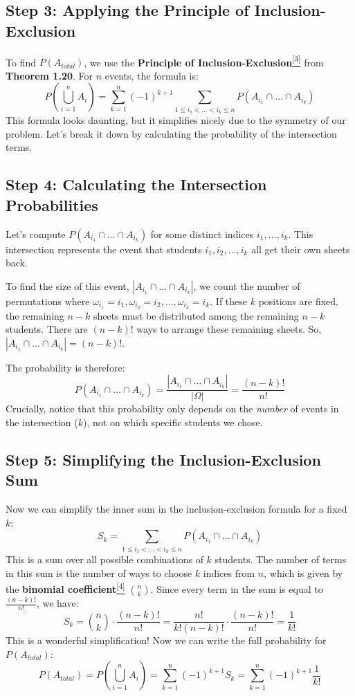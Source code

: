 \documentclass[11pt,a4paper]{article}
\begin{document}
\subsection{Step 3: Applying the Principle of Inclusion-Exclusion}
To find $P(A_{total})$, we use the \textbf{Principle of Inclusion-Exclusion}\hyperlink{note:pie}{\textsuperscript{[3]}} from \textbf{Theorem 1.20}. For $n$ events, the formula is:
\[
    P\left(\bigcup_{i=1}^n A_i\right) = \sum_{k=1}^n (-1)^{k+1} \sum_{1 \le i_1 < \dots < i_k \le n} P(A_{i_1} \cap \dots \cap A_{i_k})
\]
This formula looks daunting, but it simplifies nicely due to the symmetry of our problem. Let's break it down by calculating the probability of the intersection terms.

\subsection{Step 4: Calculating the Intersection Probabilities}
Let's compute $P(A_{i_1} \cap \dots \cap A_{i_k})$ for some distinct indices $i_1, \dots, i_k$.
This intersection represents the event that students $i_1, i_2, \dots, i_k$ all get their own sheets back.

To find the size of this event, $|A_{i_1} \cap \dots \cap A_{i_k}|$, we count the number of permutations where $\omega_{i_1}=i_1, \omega_{i_2}=i_2, \dots, \omega_{i_k}=i_k$.
If these $k$ positions are fixed, the remaining $n-k$ sheets must be distributed among the remaining $n-k$ students. There are $(n-k)!$ ways to arrange these remaining sheets.
So, $|A_{i_1} \cap \dots \cap A_{i_k}| = (n-k)!$.

The probability is therefore:
\[
    P(A_{i_1} \cap \dots \cap A_{i_k}) = \frac{|A_{i_1} \cap \dots \cap A_{i_k}|}{|\Omega|} = \frac{(n-k)!}{n!}
\]
Crucially, notice that this probability only depends on the \textit{number} of events in the intersection ($k$), not on which specific students we chose.

\subsection{Step 5: Simplifying the Inclusion-Exclusion Sum}
Now we can simplify the inner sum in the inclusion-exclusion formula for a fixed $k$:
\[
    S_k = \sum_{1 \le i_1 < \dots < i_k \le n} P(A_{i_1} \cap \dots \cap A_{i_k})
\]
This is a sum over all possible combinations of $k$ students. The number of terms in this sum is the number of ways to choose $k$ indices from $n$, which is given by the \textbf{binomial coefficient}\hyperlink{note:binomial}{\textsuperscript{[4]}} $\binom{n}{k}$.
Since every term in the sum is equal to $\frac{(n-k)!}{n!}$, we have:
\[
    S_k = \binom{n}{k} \cdot \frac{(n-k)!}{n!} = \frac{n!}{k!(n-k)!} \cdot \frac{(n-k)!}{n!} = \frac{1}{k!}
\]
This is a wonderful simplification! Now we can write the full probability for $P(A_{total})$:
\[
    P(A_{total}) = P\left(\bigcup_{i=1}^n A_i\right) = \sum_{k=1}^n (-1)^{k+1} S_k = \sum_{k=1}^n (-1)^{k+1} \frac{1}{k!}
\]
\end{document}
